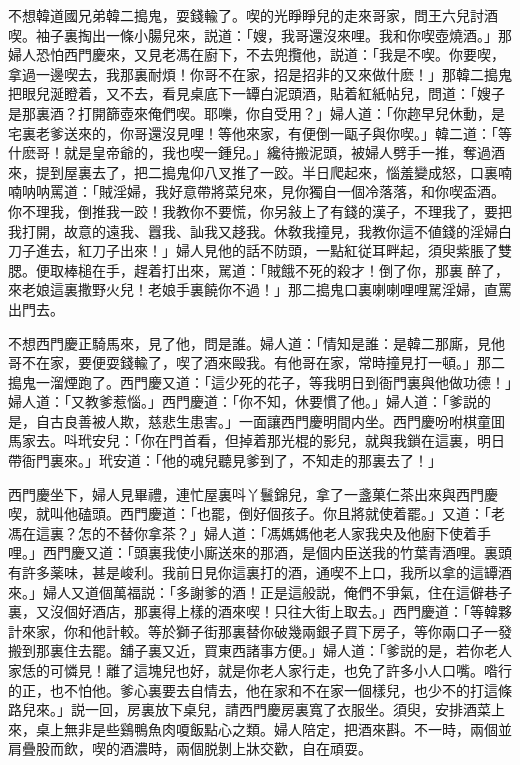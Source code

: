 不想韓道國兄弟韓二搗鬼，耍錢輸了。喫的光睜睜兒的走來哥家，問王六兒討酒喫。袖子裏掏出一條小腸兒來，説道：「嫂，我哥還沒來哩。我和你喫壺燒酒。」那婦人恐怕西門慶來，又見老馮在廚下，不去兜攬他，説道：「我是不喫。你要喫，拿過一邊喫去，我那裏耐煩！你哥不在家，招是招非的又來做什麽！」那韓二搗鬼把眼兒涎瞪着，又不去，看見桌底下一罈白泥頭酒，貼着紅紙帖兒，問道：「嫂子是那裏酒？打開篩壺來俺們喫。耶嚛，你自受用？」婦人道：「你趂早兒休動，是宅裏老爹送來的，你哥還沒見哩！等他來家，有便倒一甌子與你喫。」韓二道：「等什麽哥！就是皇帝爺的，我也喫一鍾兒。」纔待搬泥頭，被婦人劈手一推，奪過酒來，提到屋裏去了，把二搗鬼仰八叉推了一跤。半日爬起來，惱羞變成怒，口裏喃喃呐呐罵道：「賊淫婦，我好意帶將菜兒來，見你獨自一個冷落落，和你喫盃酒。你不理我，倒推我一跤！我教你不要慌，你另敍上了有錢的漢子，不理我了，要把我打開，故意的遠我、囂我、訕我又趍我。休敎我撞見，我教你這不値錢的淫婦白刀子進去，紅刀子出來！」婦人見他的話不防頭，一點紅従耳畔起，須臾紫脹了雙腮。便取棒槌在手，趕着打出來，駡道：「賊餓不死的殺才！倒了你，那裏𠳹醉了，來老娘這裏撒野火兒！老娘手裏饒你不過！」那二搗鬼口裏喇喇哩哩駡淫婦，直罵出門去。

不想西門慶正騎馬來，見了他，問是誰。婦人道：「情知是誰：是韓二那廝，見他哥不在家，要便耍錢輸了，喫了酒來毆我。有他哥在家，常時撞見打一頓。」那二搗鬼一溜煙跑了。西門慶又道：「這少死的花子，等我明日到衙門裏與他做功德！」婦人道：「又教爹惹惱。」西門慶道：「你不知，休要慣了他。」婦人道：「爹説的是，自古良善被人欺，慈悲生患害。」一面讓西門慶明間内坐。西門慶吩咐棋童囬馬家去。呌玳安兒：「你在門首看，但掉着那光棍的影兒，就與我鎖在這裏，明日帶衙門裏來。」玳安道：「他的魂兒聽見爹到了，不知走的那裏去了！」

西門慶坐下，婦人見畢禮，連忙屋裏呌丫鬟錦兒，拿了一盞菓仁茶出來與西門慶喫，就叫他磕頭。西門慶道：「也罷，倒好個孩子。你且將就使着罷。」又道：「老馮在這裏？怎的不替你拿茶？」婦人道：「馮媽媽他老人家我央及他廚下使着手哩。」西門慶又道：「頭裏我使小廝送來的那酒，是個内臣送我的竹葉青酒哩。裏頭有許多薬味，甚是峻利。我前日見你這裏打的酒，通喫不上口，我所以拿的這罈酒來。」婦人又道個萬福説：「多謝爹的酒！正是這般説，俺們不爭氣，住在這僻巷子裏，又沒個好酒店，那裏得上樣的酒來喫！只往大街上取去。」西門慶道：「等韓夥計來家，你和他計較。等於獅子街那裏替你破幾兩銀子買下房子，等你兩口子一發搬到那裏住去罷。舖子裏又近，買東西諸事方便。」婦人道：「爹説的是，若你老人家恁的可憐見！離了這塊兒也好，就是你老人家行走，也免了許多小人口嘴。喒行的正，也不怕他。爹心裏要去自情去，他在家和不在家一個樣兒，也少不的打這條路兒來。」説一回，房裏放下桌兒，請西門慶房裏寬了衣服坐。須臾，安排酒菜上來，桌上無非是些鷄鴨魚肉嗄飯點心之類。婦人陪定，把酒來斟。不一時，兩個並肩疊股而飲，喫的酒濃時，兩個脱剝上牀交歡，自在頑耍。

